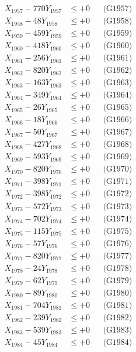 \documentclass[a4paper,10pt]{article}
\begin{document}
{\begin{align}
X_{1957} - 770Y_{1957} &\leq +0 && \text{(G1957)} \\
X_{1958} - 48Y_{1958} &\leq +0 && \text{(G1958)} \\
X_{1959} - 459Y_{1959} &\leq +0 && \text{(G1959)} \\
X_{1960} - 418Y_{1960} &\leq +0 && \text{(G1960)} \\
\allowbreak
X_{1961} - 256Y_{1961} &\leq +0 && \text{(G1961)} \\
X_{1962} - 820Y_{1962} &\leq +0 && \text{(G1962)} \\
X_{1963} - 163Y_{1963} &\leq +0 && \text{(G1963)} \\
X_{1964} - 349Y_{1964} &\leq +0 && \text{(G1964)} \\
X_{1965} - 26Y_{1965} &\leq +0 && \text{(G1965)} \\
X_{1966} - 18Y_{1966} &\leq +0 && \text{(G1966)} \\
X_{1967} - 50Y_{1967} &\leq +0 && \text{(G1967)} \\
X_{1968} - 427Y_{1968} &\leq +0 && \text{(G1968)} \\
X_{1969} - 593Y_{1969} &\leq +0 && \text{(G1969)} \\
X_{1970} - 820Y_{1970} &\leq +0 && \text{(G1970)} \\
\allowbreak
X_{1971} - 398Y_{1971} &\leq +0 && \text{(G1971)} \\
X_{1972} - 398Y_{1972} &\leq +0 && \text{(G1972)} \\
X_{1973} - 572Y_{1973} &\leq +0 && \text{(G1973)} \\
X_{1974} - 702Y_{1974} &\leq +0 && \text{(G1974)} \\
X_{1975} - 115Y_{1975} &\leq +0 && \text{(G1975)} \\
X_{1976} - 57Y_{1976} &\leq +0 && \text{(G1976)} \\
X_{1977} - 820Y_{1977} &\leq +0 && \text{(G1977)} \\
X_{1978} - 24Y_{1978} &\leq +0 && \text{(G1978)} \\
X_{1979} - 62Y_{1979} &\leq +0 && \text{(G1979)} \\
X_{1980} - 89Y_{1980} &\leq +0 && \text{(G1980)} \\
\allowbreak
X_{1981} - 704Y_{1981} &\leq +0 && \text{(G1981)} \\
X_{1982} - 239Y_{1982} &\leq +0 && \text{(G1982)} \\
X_{1983} - 539Y_{1983} &\leq +0 && \text{(G1983)} \\
X_{1984} - 45Y_{1984} &\leq +0 && \text{(G1984)} \\

\end{align}}
\end{document}
